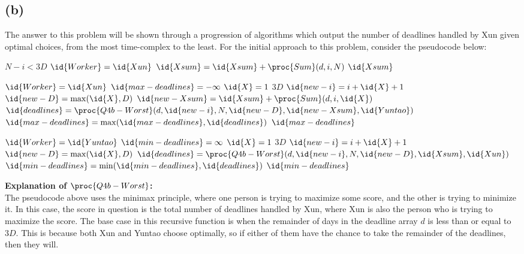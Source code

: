\subsection{(b)}
The answer to this problem will be shown through a progression of algorithms which output the number of deadlines handled by Xun given optimal choices, from the most time-complex to the least.
For the initial approach to this problem, consider the pseudocode below:
\begin{spacing}{1.2}
    \begin{codebox}
        \li \If $N - i < 3D$
        \Then
        \li \If $\id{Worker} = \id{Xun}$
        \Then
        \li $\id{Xsum} = \id{Xsum} + \proc{Sum}(d, i, N)$
        \End
        \li \Return $\id{Xsum}$
        \End

        \li \If $\id{Worker} = \id{Xun}$
        \Then
        \li $\id{max-deadlines} = -\infty$
        \li \For $\id{X} = 1$ \To $3D$
        \Do
        \li $\id{new-i} = i + \id{X} + 1$
        \li $\id{new-D} = \max(\id{X}, D)$
        \li $\id{new-Xsum} = \id{Xsum} + \proc{Sum}(d, i, \id{X})$
        \li $\id{deadlines} = \proc{Q4b-Worst}(d, \id{new-i}, N, \id{new-D}, \id{new-Xsum}, \id{Yuntao})$
        \li $\id{max-deadlines} = \max(\id{max-deadlines}, \id{deadlines})$
        \End
        \li \Return $\id{max-deadlines}$
        \End

        \li \If $\id{Worker} = \id{Yuntao}$
        \Then
        \li $\id{min-deadlines} = \infty$
        \li \For $\id{X} = 1$ \To $3D$
        \Do
        \li $\id{new-i} = i + \id{X} + 1$
        \li $\id{new-D} = \max(\id{X}, D)$
        \li $\id{deadlines} = \proc{Q4b-Worst}(d, \id{new-i}, N,\id{new-D}, \id{Xsum}, \id{Xun})$
        \li $\id{min-deadlines} = \min(\id{min-deadlines}, \id{deadlines})$
        \End
        \li \Return $\id{min-deadlines}$
        \End
    \end{codebox}
\end{spacing}
\vspace{7mm}
\textbf{Explanation of $\proc{Q4b-Worst}$:}\\
The pseudocode above uses the minimax principle, where one person is trying to maximize some score, and the other is trying to minimize it.
In this case, the score in question is the total number of deadlines handled by Xun, where Xun is also the person who is trying to maximize the score.
The base case in this recursive function is when the remainder of days in the deadline array $d$ is less than or equal to $3D$.
This is because both Xun and Yuntao choose optimally, so if either of them have the chance to take the remainder of the deadlines, then they will.

